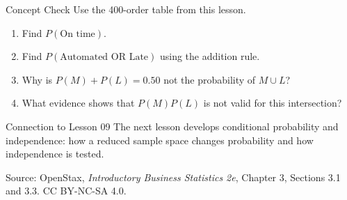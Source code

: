 \documentclass[aspectratio=169,10pt,english]{beamer}
\begin{document}
\begin{frame}{Concept Check}
  Use the 400-order table from this lesson.
  \begin{enumerate}
    \item Find \(P(\text{On time})\).
    \item Find \(P(\text{Automated OR Late})\) using the addition rule.
    \item Why is \(P(M)+P(L)=0.50\) not the probability of \(M\cup L\)?
    \item What evidence shows that \(P(M)P(L)\) is not valid for this
      intersection?
  \end{enumerate}

  \vspace{0.4em}
  \begin{block}{Connection to Lesson 09}
    The next lesson develops conditional probability and independence: how a
    reduced sample space changes probability and how independence is tested.
  \end{block}

  \vfill
  \scriptsize Source: OpenStax, \textit{Introductory Business Statistics 2e},
  Chapter 3, Sections 3.1 and 3.3. CC BY-NC-SA 4.0.
\end{frame}

\appendix
\end{document}
